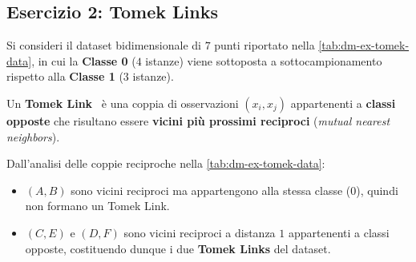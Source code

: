 \FloatBarrier
\subsection{Esercizio 2: Tomek Links}
\label{sec:dm-ex-tomek}

Si consideri il dataset bidimensionale di $7$ punti riportato nella \autoref{tab:dm-ex-tomek-data}, in cui la \textbf{Classe 0} ($4$ istanze) viene sottoposta a sottocampionamento rispetto alla \textbf{Classe 1} ($3$ istanze).

\begin{definition}
Un \textbf{Tomek Link}~\cite{tomek1976} \`e una coppia di osservazioni $(x_i, x_j)$ appartenenti a \textbf{classi opposte} che risultano essere \textbf{vicini pi\`u prossimi reciproci} (\textit{mutual nearest neighbors}).
\end{definition}

\begin{table}[H]
\centering
\caption{Dataset e identificazione dei vicini pi\`u prossimi per l'esercizio sui Tomek Links.}
\label{tab:dm-ex-tomek-data}
\small
{}
\end{table}

Dall'analisi delle coppie reciproche nella \autoref{tab:dm-ex-tomek-data}:
\begin{itemize}
    \item $(A, B)$ sono vicini reciproci ma appartengono alla stessa classe ($0$), quindi non formano un Tomek Link.
    \item \textbf{$(C, E)$} e \textbf{$(D, F)$} sono vicini reciproci a distanza $1$ appartenenti a classi opposte, costituendo dunque i due \textbf{Tomek Links} del dataset.
\end{itemize}


